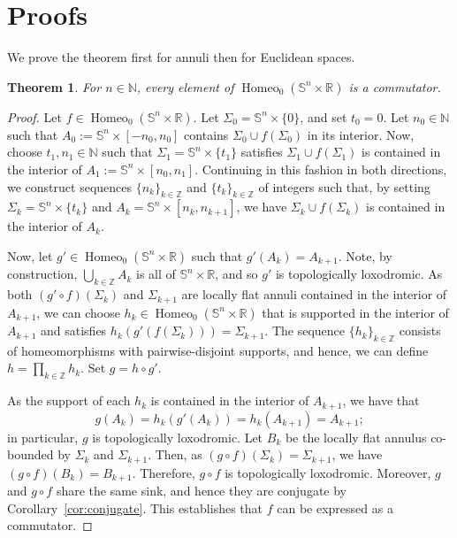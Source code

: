 \documentclass[microtype]{gtpart}
\newcommand{\br}{\mathbb{R}}
\newcommand{\bz}{\mathbb Z}
\newcommand{\bn}{\mathbb N}
\DeclareMathOperator{\Homeo}{Homeo}
\newtheorem{Thm}{Theorem}[section]
\theoremstyle{definition}
\numberwithin{equation}{section}
\begin{document}
\section{Proofs}

We prove the theorem first for annuli then for Euclidean spaces.  

\begin{Thm}
\label{thm:annulus}
For \( n \in \bn \), every element of \( \Homeo_0(\mathbb S^{n} \times \br) \) is a commutator. 
\end{Thm}

\begin{proof}
Let \( f \in \Homeo_0(\mathbb S^{n} \times \br) \). 
Let \( \Sigma_0 = \mathbb S^{n} \times \{0\} \), and set \( t_0 = 0 \). 
Let \( n_0 \in \bn \) such that \( A_0 := \mathbb S^{n} \times [-n_0, n_0] \) contains \( \Sigma_0 \cup f(\Sigma_0) \) in its interior. 
Now, choose \( t_1, n_1 \in \bn \) such that \( \Sigma_{1} = \mathbb S^{n} \times \{t_1\} \)  satisfies \( \Sigma_{1} \cup f(\Sigma_{1}) \) is contained in the interior of \( A_{1} := \mathbb S^{n} \times [n_0, n_1] \). 
Continuing in this fashion in both directions, we construct sequences \( \{n_k\}_{k\in\bz} \) and \( \{t_k\}_{k\in\bz} \) of integers such that, by setting \( \Sigma_k =  \mathbb S^{n} \times \{t_k\} \) and \( A_k = \mathbb S^{n} \times [n_k, n_{k+1}] \), we have \( \Sigma_k \cup f(\Sigma_k) \) is contained in the interior of \( A_k \). 

Now, let \( g' \in \Homeo_0(\mathbb S^{n} \times \br) \) such that \( g'(A_k) = A_{k+1} \).
Note, by construction, \( \bigcup_{k\in\bz} A_k \) is all of \( \mathbb S^n \times \br \), and so \( g' \) is topologically loxodromic. 
As both \( (g'\circ f)(\Sigma_k) \) and \( \Sigma_{k+1} \) are locally flat annuli contained in the interior of \( A_{k+1} \), we can choose \( h_k \in \Homeo_0(\mathbb S^{n} \times \br) \) that is supported in the interior of \( A_{k+1} \) and satisfies \( h_k(g'(f(\Sigma_k))) = \Sigma_{k+1} \). 
The sequence \( \{h_k\}_{k\in \bz} \) consists of homeomorphisms with pairwise-disjoint supports, and hence, we can define \( h = \prod_{k\in\bz} h_k \).
Set \( g = h\circ g' \). 

As the support of each \( h_k \) is contained in the interior of \( A_{k+1} \), we have that \[ g(A_k) = h_k(g'(A_k)) = h_k(A_{k+1}) = A_{k+1}; \] in particular, \( g \) is topologically loxodromic.
Let \( B_k \) be the locally flat annulus co-bounded by \( \Sigma_k \) and \( \Sigma_{k+1} \).
Then, as \( (g\circ f)(\Sigma_k) = \Sigma_{k+1} \), we have \( (g\circ f)(B_k) = B_{k+1} \).
Therefore, \( g\circ f \) is topologically loxodromic.
Moreover, \( g \) and \( g\circ f \) share the same sink, and hence they are  conjugate  by Corollary~\ref{cor:conjugate}.
This establishes that \( f \) can be expressed as a commutator.  
\end{proof}
\end{document}
